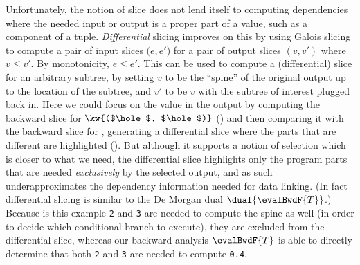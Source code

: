 Unfortunately, the notion of slice does not lend itself to computing dependencies where the needed input or output is a proper part of a value, such as a component of a tuple. \emph{Differential} slicing \cite{perera12a} improves on this by using Galois slicing to compute a pair of input slices $(e,e'$) for a pair of output slices $(v,v')$ where $v \leq v'$. By monotonicity, $e \leq e'$. This can be used to compute a (differential) slice for an arbitrary subtree, by setting $v$ to be the ``spine'' of the original output up to the location of the subtree, and $v'$ to be $v$ with the subtree of interest plugged back in. Here we could focus on the value  in the output by computing the backward slice for $\kw{($\hole$, $\hole$)}$ () and then comparing it with the backward slice for , generating a differential slice where the parts that are different are highlighted (). But although it supports a notion of selection which is closer to what we need, the differential slice highlights only the program parts that are needed \emph{exclusively} by the selected output, and as such underapproximates the dependency information needed for data linking. (In fact differential slicing is similar to the De Morgan dual $\dual{\evalBwdF{T}}$.) Because is this example \lstinline{2} and \lstinline{3} are needed to compute the spine as well (in order to decide which conditional branch to execute), they are excluded from the differential slice, whereas our backward analysis $\evalBwdF{T}$ is able to directly determine that both \lstinline{2} and \lstinline{3} are needed to compute \lstinline{0.4}.
